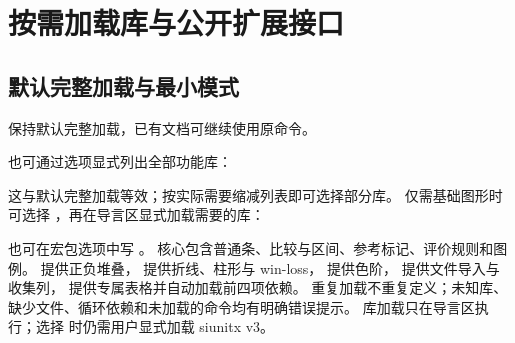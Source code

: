 \section{按需加载库与公开扩展接口}
\subsection{默认完整加载与最小模式}
\key{\usepackage{gradbars}} 保持默认完整加载，已有文档可继续使用原命令。\par
也可通过选项显式列出全部功能库：
\begin{codeonly}
\usepackage[libraries={stack,spark,heat,csv,table}]{gradbars}
\end{codeonly}
这与默认完整加载等效；按实际需要缩减列表即可选择部分库。
仅需基础图形时可选择 ，再在导言区显式加载需要的库：
\begin{codeonly}
\usepackage[libraries=none]{gradbars}
\end{codeonly}
也可在宏包选项中写 。
核心包含普通条、比较与区间、参考标记、评价规则和图例。
 提供正负堆叠， 提供折线、柱形与 win-loss， 提供色阶，
 提供文件导入与收集列， 提供专属表格并自动加载前四项依赖。
重复加载不重复定义；未知库、缺少文件、循环依赖和未加载的命令均有明确错误提示。
库加载只在导言区执行；选择  时仍需用户显式加载 siunitx v3。
